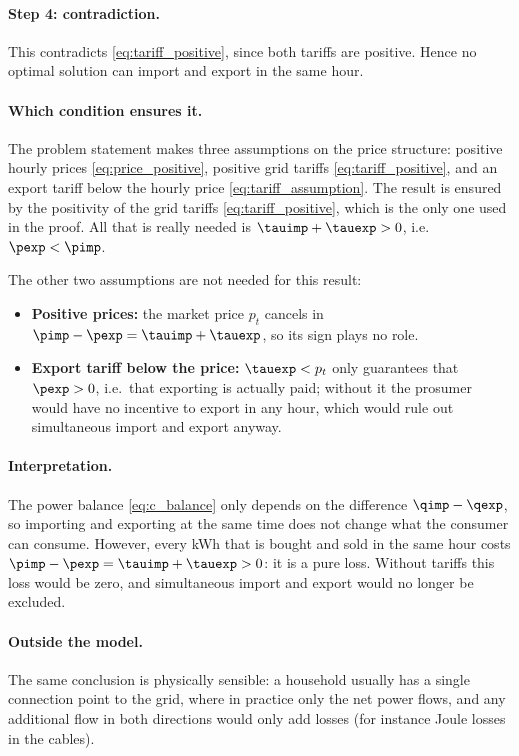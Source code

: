 \paragraph{Step 4: contradiction.}
This contradicts \eqref{eq:tariff_positive}, since both tariffs are positive. Hence no optimal
solution can import and export in the same hour.

\paragraph{Which condition ensures it.}
The problem statement makes three assumptions on the price structure: positive hourly prices
\eqref{eq:price_positive}, positive grid tariffs \eqref{eq:tariff_positive}, and an export
tariff below the hourly price \eqref{eq:tariff_assumption}. The result is ensured by the
positivity of the grid tariffs \eqref{eq:tariff_positive}, which is the only one used in the
proof. All that is really needed is $\tauimp + \tauexp > 0$, i.e.\ $\pexp < \pimp$.

The other two assumptions are not needed for this result:
\begin{itemize}
    \item \textbf{Positive prices:} the market price $p_t$ cancels in
    $\pimp - \pexp = \tauimp + \tauexp$, so its sign plays no role.
    \item \textbf{Export tariff below the price:} $\tauexp < p_t$ only guarantees that
    $\pexp > 0$, i.e.\ that exporting is actually paid; without it the prosumer would have no
    incentive to export in any hour, which would rule out simultaneous import and export
    anyway.
\end{itemize}

\paragraph{Interpretation.}
The power balance \eqref{eq:c_balance} only depends on the difference $\qimp - \qexp$, so
importing and exporting at the same time does not change what the consumer can consume.
However, every kWh that is bought and sold in the same hour costs
$\pimp - \pexp = \tauimp + \tauexp > 0$: it is a pure loss. Without tariffs this loss would be
zero, and simultaneous import and export would no longer be excluded.

\paragraph{Outside the model.}
The same conclusion is physically sensible: a household usually has a single connection point
to the grid, where in practice only the net power flows, and any additional flow in both
directions would only add losses (for instance Joule losses in the cables).

